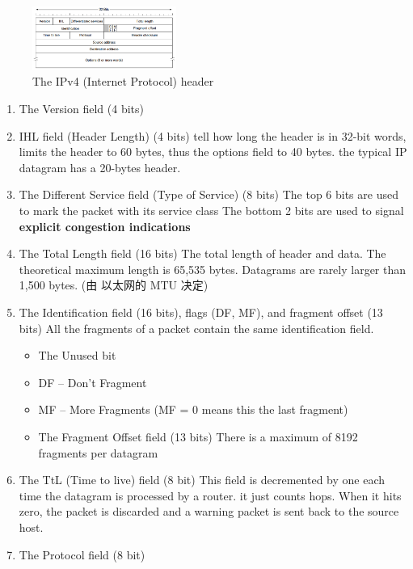 \begin{figure}[!htb]
    \centering
    \includegraphics[width=0.42\textwidth]{pic/CN5/The IPv4 (Internet Protocol) header}
    \caption{The IPv4 (Internet Protocol) header}
\end{figure}
\begin{enumerate}
    \item The Version field (4 bits)
    \item IHL field (Header Length) (4 bits)
    \subitem tell how long the header is in 32-bit words, limits the
    header to 60 bytes, thus the options field to 40 bytes. 
    \subitem the typical IP datagram has a 20-bytes header.
    \item The Different Service field (Type of Service) (8 bits)
    \subitem The top 6 bits are used to mark the packet with its service class
    \subitem The bottom 2 bits are used to signal \textbf{explicit congestion indications}
    \item The Total Length field (16 bits)
    \subitem The total length of header and data.
    \subitem The theoretical maximum length is 65,535 bytes.
    \subitem Datagrams are rarely larger than 1,500 bytes. (由 以太网的 MTU 决定)
    \item The Identification field (16 bits), flags (DF, MF), and fragment offset (13 bits)
    \subitem All the fragments of a packet contain the same identification field.
    \begin{itemize}
        \item The Unused bit
        \item DF -- Don't Fragment
        \item MF -- More Fragments 
        \subitem (MF = 0 means this the last fragment)
        \item The Fragment Offset field (13 bits)
        \subitem There is a maximum of 8192 fragments per datagram
    \end{itemize}
    \item The TtL (Time to live) field (8 bit)
    \subitem This field is decremented by one each time the datagram is processed by a router.
    \subitem it just counts hops. When it hits zero, the packet is discarded and a warning packet is sent back to the source host.
    \item The Protocol field (8 bit)

\end{enumerate}

